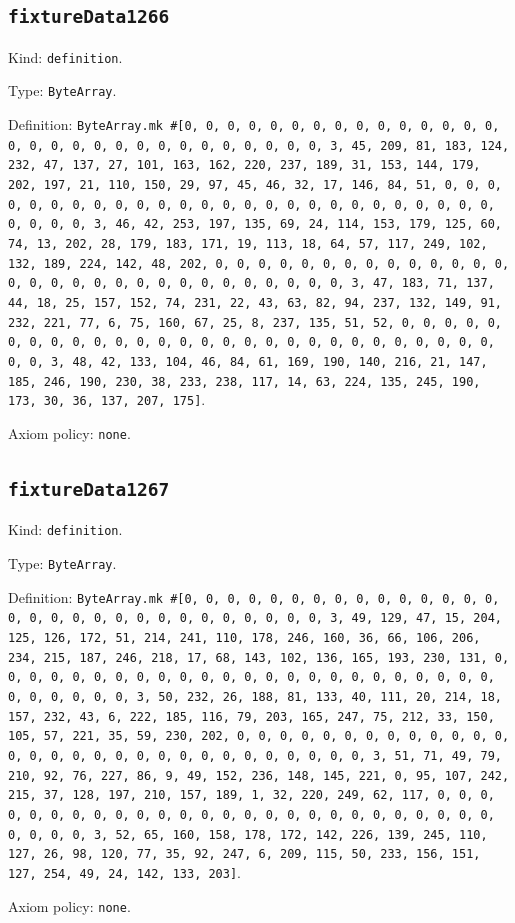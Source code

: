 \documentclass[11pt]{article}
\begin{document}
\subsection*{\texttt{fixtureData1266}}
\noindent Kind: \texttt{definition}.\par
\noindent Type: \texttt{ByteArray}.\par
\noindent Definition: \texttt{ByteArray.mk \#[0, 0, 0, 0, 0, 0, 0, 0, 0, 0, 0, 0, 0, 0, 0, 0, 0, 0, 0, 0, 0, 0, 0, 0, 0, 0, 0, 0, 0, 0, 3, 45, 209, 81, 183, 124, 232, 47, 137, 27, 101, 163, 162, 220, 237, 189, 31, 153, 144, 179, 202, 197, 21, 110, 150, 29, 97, 45, 46, 32, 17, 146, 84, 51, 0, 0, 0, 0, 0, 0, 0, 0, 0, 0, 0, 0, 0, 0, 0, 0, 0, 0, 0, 0, 0, 0, 0, 0, 0, 0, 0, 0, 0, 0, 3, 46, 42, 253, 197, 135, 69, 24, 114, 153, 179, 125, 60, 74, 13, 202, 28, 179, 183, 171, 19, 113, 18, 64, 57, 117, 249, 102, 132, 189, 224, 142, 48, 202, 0, 0, 0, 0, 0, 0, 0, 0, 0, 0, 0, 0, 0, 0, 0, 0, 0, 0, 0, 0, 0, 0, 0, 0, 0, 0, 0, 0, 0, 0, 3, 47, 183, 71, 137, 44, 18, 25, 157, 152, 74, 231, 22, 43, 63, 82, 94, 237, 132, 149, 91, 232, 221, 77, 6, 75, 160, 67, 25, 8, 237, 135, 51, 52, 0, 0, 0, 0, 0, 0, 0, 0, 0, 0, 0, 0, 0, 0, 0, 0, 0, 0, 0, 0, 0, 0, 0, 0, 0, 0, 0, 0, 0, 0, 3, 48, 42, 133, 104, 46, 84, 61, 169, 190, 140, 216, 21, 147, 185, 246, 190, 230, 38, 233, 238, 117, 14, 63, 224, 135, 245, 190, 173, 30, 36, 137, 207, 175]}.\par
\noindent Axiom policy: \texttt{none}.\par
\subsection*{\texttt{fixtureData1267}}
\noindent Kind: \texttt{definition}.\par
\noindent Type: \texttt{ByteArray}.\par
\noindent Definition: \texttt{ByteArray.mk \#[0, 0, 0, 0, 0, 0, 0, 0, 0, 0, 0, 0, 0, 0, 0, 0, 0, 0, 0, 0, 0, 0, 0, 0, 0, 0, 0, 0, 0, 0, 3, 49, 129, 47, 15, 204, 125, 126, 172, 51, 214, 241, 110, 178, 246, 160, 36, 66, 106, 206, 234, 215, 187, 246, 218, 17, 68, 143, 102, 136, 165, 193, 230, 131, 0, 0, 0, 0, 0, 0, 0, 0, 0, 0, 0, 0, 0, 0, 0, 0, 0, 0, 0, 0, 0, 0, 0, 0, 0, 0, 0, 0, 0, 0, 3, 50, 232, 26, 188, 81, 133, 40, 111, 20, 214, 18, 157, 232, 43, 6, 222, 185, 116, 79, 203, 165, 247, 75, 212, 33, 150, 105, 57, 221, 35, 59, 230, 202, 0, 0, 0, 0, 0, 0, 0, 0, 0, 0, 0, 0, 0, 0, 0, 0, 0, 0, 0, 0, 0, 0, 0, 0, 0, 0, 0, 0, 0, 0, 3, 51, 71, 49, 79, 210, 92, 76, 227, 86, 9, 49, 152, 236, 148, 145, 221, 0, 95, 107, 242, 215, 37, 128, 197, 210, 157, 189, 1, 32, 220, 249, 62, 117, 0, 0, 0, 0, 0, 0, 0, 0, 0, 0, 0, 0, 0, 0, 0, 0, 0, 0, 0, 0, 0, 0, 0, 0, 0, 0, 0, 0, 0, 0, 3, 52, 65, 160, 158, 178, 172, 142, 226, 139, 245, 110, 127, 26, 98, 120, 77, 35, 92, 247, 6, 209, 115, 50, 233, 156, 151, 127, 254, 49, 24, 142, 133, 203]}.\par
\noindent Axiom policy: \texttt{none}.\par
\end{document}
